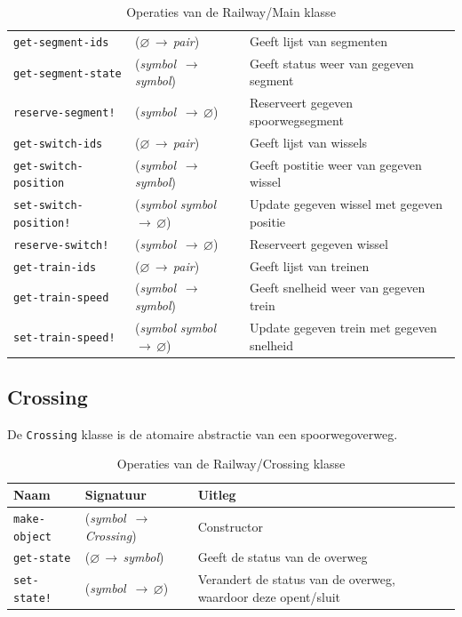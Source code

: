 \documentclass[a4paper, 11pt]{article}
\newcommand{\naar}{\,$\rightarrow$\,}
\renewcommand{\empty}{$\varnothing$}
\newcommand{\<}{\scriptsize\textless\normalsize}
\renewcommand{\>}{\scriptsize\textgreater\normalsize}
\begin{document}
\begin{table}[H]
\begin{center}
\begin{tabular}{|l l l|}
			\texttt{get-segment-ids} & (\empty \naar \textit{pair}) & Geeft lijst van segmenten\\
			\texttt{get-segment-state} & (\textit{symbol} \naar \textit{symbol}) & Geeft status weer van gegeven segment\\
			\texttt{reserve-segment!} & (\textit{symbol} \naar \empty) & Reserveert gegeven spoorwegsegment\\
			\texttt{get-switch-ids} & (\empty \naar \textit{pair}) & Geeft lijst van wissels\\
			\texttt{get-switch-position} & (\textit{symbol} \naar \textit{symbol}) & Geeft postitie weer van gegeven wissel\\
			\texttt{set-switch-position!} & (\textit{symbol} \textit{symbol} \naar \empty) & Update gegeven wissel met gegeven positie\\
			\texttt{reserve-switch!} & (\textit{symbol} \naar \empty) & Reserveert gegeven wissel\\
			\texttt{get-train-ids} & (\empty \naar \textit{pair}) & Geeft lijst van treinen\\
			\texttt{get-train-speed} & (\textit{symbol} \naar \textit{symbol}) & Geeft snelheid weer van gegeven trein\\
			\texttt{set-train-speed!} & (\textit{symbol} \textit{symbol} \naar \empty) & Update gegeven trein met gegeven snelheid\\
			\hline
		\end{tabular}
		\caption{Operaties van de Railway/Main klasse}
	\end{center}
\end{table}

\subsection{Crossing} %
De \texttt{Crossing} klasse is de atomaire abstractie van een spoorwegoverweg.
\begin{table}[H]
	\begin{center}
		\begin{tabular}{|l l l|}
			\hline
			\textbf{Naam} & \textbf{Signatuur} & \textbf{Uitleg}\\
			\hline
			\texttt{make-object} & (\textit{symbol} \naar \textit{Crossing}) & Constructor\\
			\hline
			\texttt{get-state} & (\empty \naar \textit{symbol}) & Geeft de status van de overweg\\
			\texttt{set-state!} & (\textit{symbol} \naar \empty) & Verandert de status van de overweg, waardoor deze opent/sluit\\
			\hline
		\end{tabular}
		\caption{Operaties van de Railway/Crossing klasse}
	\end{center}
\end{table}
\end{document}
